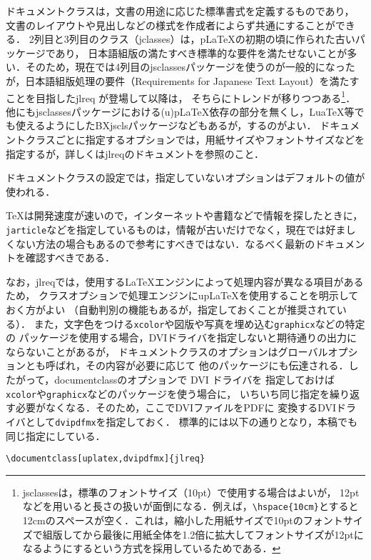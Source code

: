 ドキュメントクラスは，文書の用途に応じた標準書式を定義するものであり，
文書のレイアウトや見出しなどの様式を作成者によらず共通にすることができる．
2列目と3列目のクラス（jclasses）は，{p\LaTeX}の初期の頃に作られた古いパッケージであり，
日本語組版の満たすべき標準的な要件を満たせないことが多い．そのため，現在では4列目のjsclassesパッケージ\cite{jscls}を使うのが一般的になったが，日本語組版処理の要件（Requirements for Japanese Text Layout）\cite{jlw3c}を満たすことを目指したjlreq \cite{jlreq}が登場して以降は，
そちらにトレンドが移りつつある\footnote{jsclassesは，標準のフォントサイズ（10pt）で使用する場合はよいが，
12ptなどを用いると長さの扱いが面倒になる．例えば，\texttt{\textbackslash hspace\{10cm\}}とすると12cmのスペースが空く．これは，縮小した用紙サイズで10ptのフォントサイズで組版してから最後に用紙全体を1.2倍に拡大してフォントサイズが12ptになるようにするという方式を採用しているためである．}．他にもjsclassesパッケージにおける(u)p{\LaTeX}依存の部分を無くし，Lua{\TeX}等でも使えるようにしたBXjsclsパッケージなどもあるが，するのがよい．
ドキュメントクラスごとに指定するオプションでは，用紙サイズやフォントサイズなどを
指定するが，詳しくはjlreqのドキュメントを参照のこと．
\begin{screen}
\small\sffamily
ドキュメントクラスの設定では，指定していないオプションはデフォルトの値が使われる．
\end{screen}
\begin{screen}
\small\sffamily
{\TeX}は開発速度が速いので，インターネットや書籍などで情報を探したときに，\texttt{jarticle}などを指定しているものは，情報が古いだけでなく，現在では好ましくない方法の場合もあるので参考にすべきではない．なるべく最新のドキュメントを確認すべきである．
\end{screen}

なお，jlreqでは，使用する{\LaTeX}エンジンによって処理内容が異なる項目があるため，
クラスオプションで処理エンジンに{up\LaTeX}を使用することを明示しておく方がよい
（自動判別の機能もあるが，指定しておくことが推奨されている）．
また，文字色をつける\texttt{xcolor}や図版や写真を埋め込む\texttt{graphicx}などの特定の
パッケージを使用する場合，DVIドライバを指定しないと期待通りの出力にならないことがあるが，
ドキュメントクラスのオプションはグローバルオプションとも呼ばれ，その内容が必要に応じて
他のパッケージにも伝達される．したがって，documentclassのオプションで DVI ドライバを
指定しておけば\texttt{xcolor}や\texttt{graphicx}などのパッケージを使う場合に，
いちいち同じ指定を繰り返す必要がなくなる．そのため，ここでDVIファイルをPDFに
変換するDVIドライバとして\texttt{dvipdfmx}を指定しておく．
標準的には以下の通りとなり，本稿でも同じ指定にしている．
\begin{tcolorbox}[colback=blue!5!white,colframe=blue!70!black]
\begin{lstlisting}
\documentclass[uplatex,dvipdfmx]{jlreq}
\end{lstlisting}
\end{tcolorbox}


